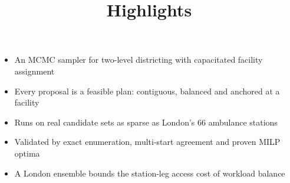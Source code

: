\documentclass{elsarticle}
\begin{document}
\begin{frontmatter}
\title{Highlights}
\end{frontmatter}
\begin{itemize}
\item An MCMC sampler for two-level districting with capacitated facility assignment
\item Every proposal is a feasible plan: contiguous, balanced and anchored at a facility
\item Runs on real candidate sets as sparse as London's 66 ambulance stations
\item Validated by exact enumeration, multi-start agreement and proven MILP optima
\item A London ensemble bounds the station-leg access cost of workload balance
\end{itemize}
\end{document}
